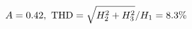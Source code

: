 \documentclass[preview]{standalone}
\begin{document}
\begin{align*}
\special{dvisvgm:raw <g id='unique000'>}A=0.42,\ \text{THD}=\sqrt{H_2^2+H_3^2}/H_1=8.3\%\special{dvisvgm:raw </g>}
\end{align*}
\end{document}
